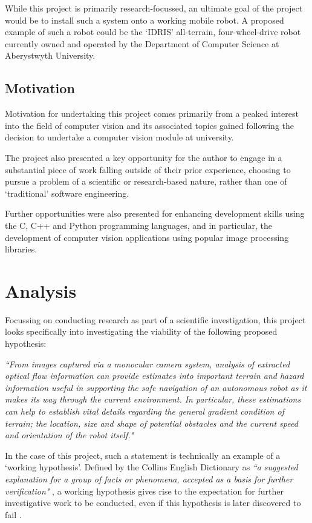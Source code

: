 While this project is primarily research-focussed, an ultimate goal of the project would be to install such a system onto a working mobile robot. A proposed example of such a robot could be the `IDRIS' all-terrain, four-wheel-drive robot currently owned and operated by the Department of Computer Science at Aberystwyth University.


\subsection{Motivation}

Motivation for undertaking this project comes primarily from a peaked interest into the field of computer vision and its associated topics gained following the decision to undertake a computer vision module at university.

The project also presented a key opportunity for the author to engage in a substantial piece of work falling outside of their prior experience, choosing to pursue a problem of a scientific or research-based nature, rather than one of `traditional' software engineering. 

Further opportunities were also presented for enhancing development skills using the C, C++ and Python programming languages, and in particular, the development of computer vision applications using popular image processing libraries.


\section{Analysis}

Focussing on conducting research as part of a scientific investigation, this project looks specifically into investigating the viability of the following proposed hypothesis: 

\indent \textit{``From images captured via a monocular camera system, analysis of extracted optical flow information can provide estimates into important terrain and hazard information useful in supporting the safe navigation of an autonomous robot as it makes its way through the current environment. In particular, these estimations can help to establish vital details regarding the general gradient condition of terrain; the location, size and shape of potential obstacles and the current speed and orientation of the robot itself."}
 
In the case of this project, such a statement is technically an example of a `working hypothesis'. Defined by the Collins English Dictionary as \textit{``a suggested explanation for a group of facts or phenomena, accepted as a basis for further verification"} \cite{collins}, a working hypothesis gives rise to the expectation for further investigative work to be conducted, even if this hypothesis is later discovered to fail \cite{century}. 

